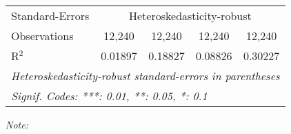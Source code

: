\begin{table}[htbp!]
\begin{adjustbox}{width = 1\textwidth, max height = 0.95\textheight, center}
\begin{threeparttable}[b]
\begin{tabular}{lcccc}
            Standard-Errors & \multicolumn{4}{c}{Heteroskedasticity-robust} \\ 
            Observations         & 12,240                   & 12,240                         & 12,240                         & 12,240\\  
            R$^2$                & 0.01897                  & 0.18827                        & 0.08826                        & 0.30227\\  
            \midrule \midrule
            \multicolumn{5}{l}{\emph{Heteroskedasticity-robust standard-errors in parentheses}}\\
            \multicolumn{5}{l}{\emph{Signif. Codes: ***: 0.01, **: 0.05, *: 0.1}}\\
         \end{tabular}
         
         \begin{tablenotes}\item \medskip \textit{Note:}
         \end{tablenotes}
      \end{threeparttable}
   \end{adjustbox}
\end{table}


